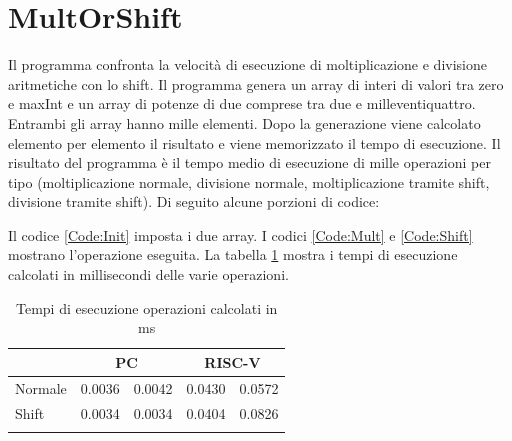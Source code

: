 \documentclass[12pt,a4paper]{report}
\begin{document}
\section{MultOrShift}
Il programma confronta la velocità di esecuzione di moltiplicazione e divisione aritmetiche con lo shift. Il programma genera un array di interi di valori tra zero e maxInt e un array di potenze di due comprese tra due e milleventiquattro. Entrambi gli array hanno mille elementi. Dopo la generazione viene calcolato elemento per elemento il risultato e viene memorizzato il tempo di esecuzione. Il risultato del programma è il tempo medio di esecuzione di mille operazioni per tipo (moltiplicazione normale, divisione normale, moltiplicazione tramite shift, divisione tramite shift). Di seguito alcune porzioni di codice:





Il codice \ref{Code:Init} imposta i due array.  I codici \ref{Code:Mult} e \ref{Code:Shift} mostrano l'operazione eseguita.
La tabella \ref{Tab:tempi_esecuzioneMS} mostra i tempi di esecuzione calcolati in millisecondi delle varie operazioni.

\begin{table}[h]
\centering
\begin{tabular}{lcccc}
\cline{2-5}
\multicolumn{1}{l|}{}         & \multicolumn{2}{c|}{PC}                                   & \multicolumn{2}{c|}{RISC-V}                               \\ \hline
\multicolumn{1}{|l|}{Normale} & \multicolumn{1}{c|}{0.0036} & \multicolumn{1}{c|}{0.0042} & \multicolumn{1}{c|}{0.0430} & \multicolumn{1}{c|}{0.0572} \\ \hline
\multicolumn{1}{|l|}{Shift}   & \multicolumn{1}{c|}{0.0034} & \multicolumn{1}{c|}{0.0034} & \multicolumn{1}{c|}{0.0404} & \multicolumn{1}{c|}{0.0826} \\ \hline
                              & \multicolumn{1}{l}{}        & \multicolumn{1}{l}{}        & \multicolumn{1}{l}{}        & \multicolumn{1}{l}{}       
\end{tabular}
	\label{Tab:tempi_esecuzioneMS}
	\caption{Tempi di esecuzione operazioni calcolati in ms}
\end{table}
	
\end{document}
